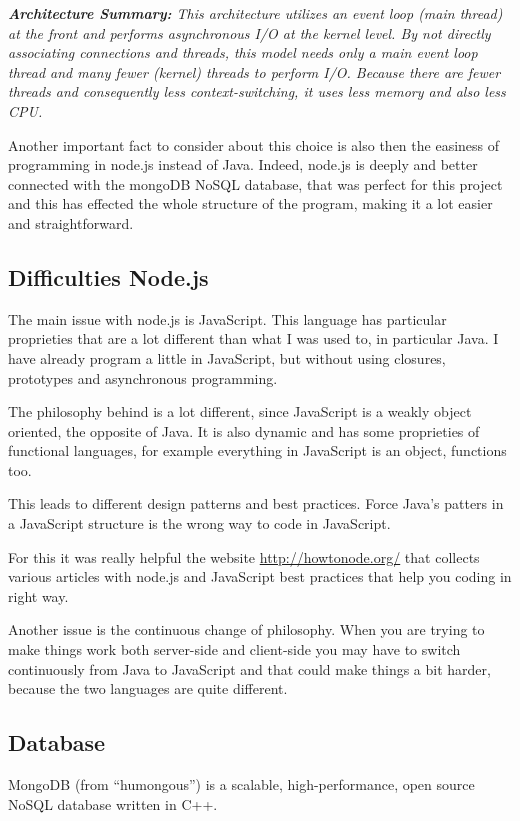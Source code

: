 \textit{\textbf{Architecture Summary:} This architecture utilizes an event loop (main thread) at the front and performs asynchronous I/O at the kernel level. By not directly associating connections and threads, this model needs only a main event loop thread and many fewer (kernel) threads to perform I/O. Because there are fewer threads and consequently less context-switching, it uses less memory and also less CPU.}

Another important fact to consider about this choice is also then the easiness of programming in node.js instead of Java. Indeed, node.js is deeply and better connected with the mongoDB NoSQL database, that was perfect for this project and this has effected the whole structure of the program, making it a lot easier and straightforward.

\subsection{Difficulties Node.js}
The main issue with node.js is JavaScript. This language has particular proprieties that are a lot different than what I was used to, in particular Java. I have already program a little in JavaScript, but without using closures, prototypes and asynchronous programming.

The philosophy behind is a lot different, since JavaScript is a weakly object oriented, the opposite of Java. It is also dynamic and has some proprieties of functional languages, for example everything in JavaScript is an object, functions too.

This leads to different design patterns and best practices. Force Java's patters in a JavaScript structure is the wrong way to code in JavaScript.

For this it was really helpful the website \url{http://howtonode.org/} that collects various articles with node.js and JavaScript best practices that help you coding in right way.

Another issue is the continuous change of philosophy. When you are trying to make things work both server-side and client-side you may have to switch continuously from Java to JavaScript and that could make things a bit harder, because the two languages are quite different.

\subsection{Database}

MongoDB (from ``humongous'') is a scalable, high-performance, open source NoSQL database written in C++.

